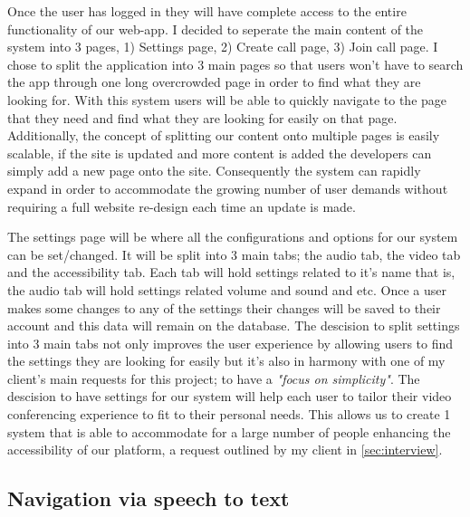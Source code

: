 Once the user has logged in they will have complete access to 
the entire functionality of our web-app. I decided to seperate
the main content of the system into 3 pages, 1) Settings page,
2) Create call page, 3) Join call page. I chose to split the 
application into 3 main pages so that users won't have to 
search the app through one long overcrowded page in order to 
find what they are looking for. With this system users will be
able to quickly navigate to the page that they need and find 
what they are looking for easily on that page. Additionally, 
the concept of splitting our content onto multiple pages is 
easily scalable, if the site is updated and more content is 
added the developers can simply add a new page onto the site.
Consequently the system can rapidly expand in order to 
accommodate the growing number of user demands without
requiring a full website re-design each time an update is 
made. \\ \vspace{0.2cm}

The settings page will be where all the configurations and 
options for our system can be set/changed. It will be split
into 3 main tabs; the audio tab, the video tab and the 
accessibility tab. Each tab will hold settings related to it's
name that is, the audio tab will hold settings related volume
and sound and etc. Once a user makes some changes to any of the
settings their changes will be saved to their account and this 
data will remain on the database. The descision to split 
settings into 3 main tabs not only improves the user experience
by allowing users to find the settings they are looking for
easily but it's also in harmony with one of my client's main 
requests for this project; to have a \textit{"focus on 
simplicity"}. The descision to have settings for our system
will help each user to tailor their video conferencing
experience to fit to their personal needs. This allows us to 
create 1 system that is able to accommodate for a large 
number of people enhancing the accessibility of our platform, 
a request outlined by my client in \ref{sec:interview}. 

\subsection{Navigation via speech to text}

